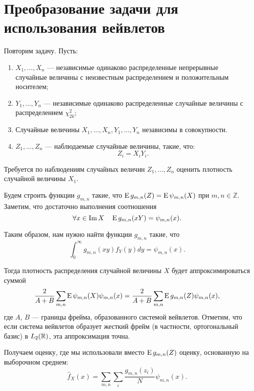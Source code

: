 \documentclass[../paper.tex]{subfiles}
\begin{document}
\section{Преобразование задачи для использования вейвлетов}
Повторим задачу. Пусть:
\begin{enumerate}
	\item $X_1, \dots, X_n$ --- независимые одинаково распределенные непрерывные случайные величины
		с неизвестным распределением и положительным носителем; 
	\item $Y_1, \dots, Y_n$ --- независимые одинаково распределенные случайные величины с распределением $\chi^2_{2k}$;
	\item Случайные величины $X_1, \dots, X_n, Y_1, \dots, Y_n$ независимы в совокупности.
	\item $Z_1, \dots, Z_n$ --- наблюдаемые случайные величины, такие, что:
		\[
			Z_i = X_i Y_i
		.\]
\end{enumerate}
Требуется по наблюдениям случайных величин $Z_1, ..., Z_n$ оценить плотность случайной величины $X_1$.

Будем строить функции $g_{m,n}$ такие, что $\operatorname{E} g_{m,n}(Z) = \operatorname{E} \psi_{m,n}(X)$ при $m, n \in \mathbb{Z}$. Заметим, что достаточно выполнения соотношения
\[
    \forall x \in \operatorname{Im} X \quad \operatorname{E} g_{m,n} (xY) = \psi_{m,n}(x) 
.\]

Таким образом, нам нужно найти функции $g_{m,n}$ такие, что
\begin{equation}\label{eq:int-eq}
	\int_0^\infty g_{m,n}(xy) f_Y(y) dy = \psi_{m,n}(x)
.\end{equation}

Тогда плотность распределения случайной величины $X$ будет аппроксимироваться суммой
\begin{equation}\label{eq:reconstruction}
	\frac{2}{A+B} \sum_{m,n} \operatorname{E} \psi_{m,n}(X)\psi_{m,n}(x)
	= \frac{2}{A+B} \sum_{m,n} \operatorname{E} g_{m,n}(Z) \psi_{m,n}(x)
,\end{equation}
где $A$, $B$ --- границы фрейма, образованного системой вейвлетов.
Отметим, что если система вейвлетов образует жесткий фрейм (в частности, ортогональный базис) в $L_2(\mathbb{R})$, эта аппроксимация точна.

Получаем оценку, где мы использовали вместо $\operatorname{E} g_{m,n}(Z)$ оценку, основанную на выборочном среднем:
\begin{equation}\label{eq:estimation}
	\hat{f}_X(x) = \sum_{m,n} \sum_i \frac{g_{m,n}(z_i)}{N} \psi_{m,n}(x)
.\end{equation}
\end{document}
